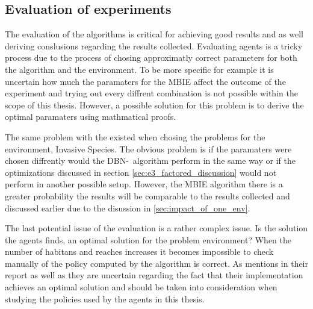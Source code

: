 \subsection{Evaluation of experiments }
The evaluation of the algorithms is critical for achieving good results and as well deriving conslusions regarding the results collected. Evaluating agents is a tricky process due to the process of chosing approximatly correct parameters for both the algorithm and the environment. To be more specific for example it is uncertain how much the paramaters for the MBIE affect the outcome of the experiment and trying out every diffrent combination is not possible within the scope of this thesis. However, a possible solution for this problem is to derive the optimal paramaters using mathmatical proofs.

The same problem with the existed when chosing the problems for the environment, Invasive Species. The obvious problem is if the paramaters were chosen diffrently would the DBN-\etre\ algorithm perform in the same way or if the optimizations discussed in section \ref{sec:e3_factored_discussion} would not perform in another possible setup. However, the MBIE algorithm there is a greater probability the results will be comparable to the results collected and discussed earlier due to the disussion in \ref{sec:impact_of_one_env}.

The last potential issue of the evaluation is a rather complex issue. Is the solution the agents finds, an optimal solution for the problem environment? When the number of habitans and reaches increases it becomes impossible to check manually of the policy computed by the algorithm is correct. As \textcite{dietterich2013pac} mentions in their report as well as they are uncertain regarding the fact that their implementation achieves an optimal solution and should be taken into consideration when studying the policies used by the agents in this thesis.